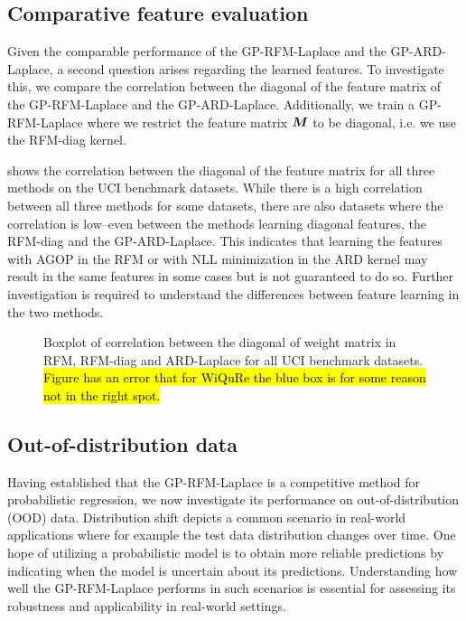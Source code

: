 \subsection{Comparative feature evaluation}
Given the comparable performance of the GP-RFM-Laplace and the GP-ARD-Laplace, a second question arises regarding the learned features.
To investigate this, we compare the correlation between the diagonal of the feature matrix of the GP-RFM-Laplace and the GP-ARD-Laplace.
Additionally, we train a GP-RFM-Laplace where we restrict the feature matrix ${\bm{M}}$ to be diagonal, i.e. we use the RFM-diag kernel.

 shows the correlation between the diagonal of the feature matrix for all three methods on the UCI benchmark datasets.
While there is a high correlation between all three methods for some datasets, there are also datasets where the correlation is low--even between the methods learning diagonal features, the RFM-diag and the GP-ARD-Laplace.
This indicates that learning the features with AGOP in the RFM or with NLL minimization in the ARD kernel
may result in the same features in some cases but is not guaranteed to do so.
Further investigation is required to understand the differences between feature learning in the two methods.


\begin{figure}
    \centering
    
    \caption{Boxplot of correlation between the diagonal of weight matrix in RFM, RFM-diag and ARD-Laplace for all UCI benchmark datasets.
        \hl{Figure has an error that for WiQuRe the blue box is for some reason not in the right spot.}
        }
    \label{fig:feature-correlation}
\end{figure}





\subsection{Out-of-distribution data}
Having established that the GP-RFM-Laplace is a competitive method for probabilistic regression, we now investigate its performance on out-of-distribution (OOD) data.
Distribution shift depicts a common scenario in real-world applications where for example the test data distribution changes over time.
One hope of utilizing a probabilistic model is to obtain more reliable predictions by indicating when the model is uncertain about its predictions.
Understanding how well the GP-RFM-Laplace performs in such scenarios is essential for assessing its robustness and applicability in real-world settings.

